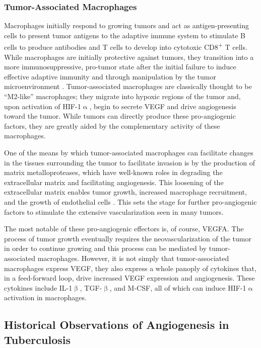 \subsubsection{Tumor\hyp{}Associated Macrophages}\label{tams}

Macrophages initially respond to growing tumors and act as antigen\hyp{}presenting cells to present tumor antigens to the adaptive immune system to stimulate B cells to produce antibodies and T cells to develop into cytotoxic CD8\textsuperscript{+} T cells. While macrophages are initially protective against tumors, they transition into a more immunosuppressive, pro\hyp{}tumor state after the initial failure to induce effective adaptive immunity and through manipulation by the tumor microenvironment \citep{Noy2014}. Tumor\hyp{}associated macrophages are classically thought to be ``M2\hyp{}like'' macrophages; they migrate into hypoxic regions of the tumor and, upon activation of HIF\hyp{}1$\upalpha$, begin to secrete VEGF and drive angiogenesis toward the tumor. While tumors can directly produce these pro\hyp{}angiogenic factors, they are greatly aided by the complementary activity of these macrophages.

One of the means by which tumor\hyp{}associated macrophages can facilitate changes in the tissues surrounding the tumor to facilitate invasion is by the production of matrix metalloproteases, which have well\hyp{}known roles in degrading the extracellular matrix and facilitating angiogenesis. This loosening of the extracellular matrix enables tumor growth, increased macrophage recruitment, and the growth of endothelial cells \citep{Lamagna2006}. This sets the stage for further pro\hyp{}angiogenic factors to stimulate the extensive vascularization seen in many tumors.

The most notable of these pro\hyp{}angiogenic effectors is, of course, VEGFA. The process of tumor growth eventually requires the neovascularization of the tumor in order to continue growing and this process can be mediated by tumor\hyp{}associated macrophages. However, it is not simply that tumor\hyp{}associated macrophages express VEGF, they also express a whole panoply of cytokines that, in a feed\hyp{}forward loop, drive increased VEGF expression and angiogenesis. These cytokines include IL\hyp{}1$\upbeta$, TGF\hyp{}$\upbeta$, and M\hyp{}CSF, all of which can induce HIF\hyp{}1$\upalpha$ activation in macrophages.

\subsection{Historical Observations of Angiogenesis in Tuberculosis}\label{histtbang}


